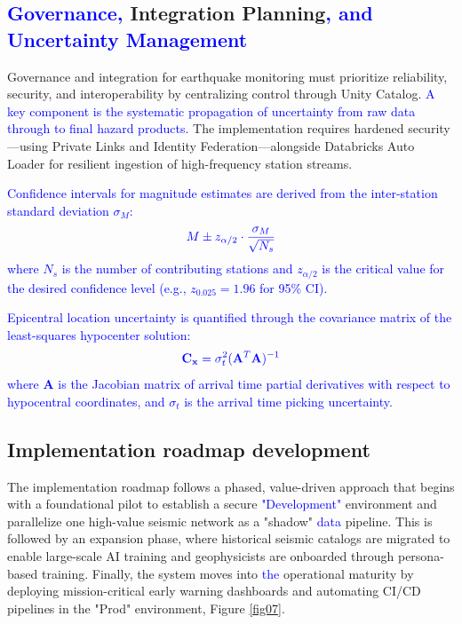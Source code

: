 \documentclass[data,article,submit,pdftex,moreauthors]{Definitions/mdpi}
\begin{document}
\subsection{\textcolor{blue}{Governance,} Integration Planning\textcolor{blue}{, and Uncertainty Management}}

Governance and integration for earthquake monitoring must prioritize reliability, security, and interoperability by centralizing control through Unity Catalog. \textcolor{blue}{A key component is the systematic propagation of uncertainty from raw data through to final hazard products.} The implementation requires hardened security—using Private Links and Identity Federation—alongside Databricks Auto Loader for resilient ingestion of high-frequency station streams.

\textcolor{blue}{Confidence intervals for magnitude estimates are derived from the inter-station standard deviation $\sigma_M$:}
\begin{equation}
\textcolor{blue}{M \pm z_{\alpha/2} \cdot \frac{\sigma_M}{\sqrt{N_s}}}
\end{equation}
\textcolor{blue}{where $N_s$ is the number of contributing stations and $z_{\alpha/2}$ is the critical value for the desired confidence level (e.g., $z_{0.025} = 1.96$ for 95\% CI).}

\textcolor{blue}{Epicentral location uncertainty is quantified through the covariance matrix of the least-squares hypocenter solution:}
\begin{equation}
\textcolor{blue}{\mathbf{C}_{\mathbf{x}} = \sigma_t^2 (\mathbf{A}^T \mathbf{A})^{-1}}
\end{equation}
\textcolor{blue}{where $\mathbf{A}$ is the Jacobian matrix of arrival time partial derivatives with respect to hypocentral coordinates, and $\sigma_t$ is the arrival time picking uncertainty.}

\subsection{Implementation roadmap development}

The implementation roadmap follows a phased, value-driven approach that begins with a foundational pilot to establish a secure \textcolor{blue}{"Development"} environment and parallelize one high-value seismic network as a "shadow" \textcolor{blue}{data} pipeline. This is followed by an expansion phase, where historical seismic catalogs are migrated to enable large-scale AI training and geophysicists are onboarded through persona-based training. Finally, the system moves into \textcolor{blue}{the} operational maturity by deploying mission-critical early warning dashboards and automating CI/CD pipelines in the "Prod" environment, Figure \ref{fig07}. 
\end{document}
